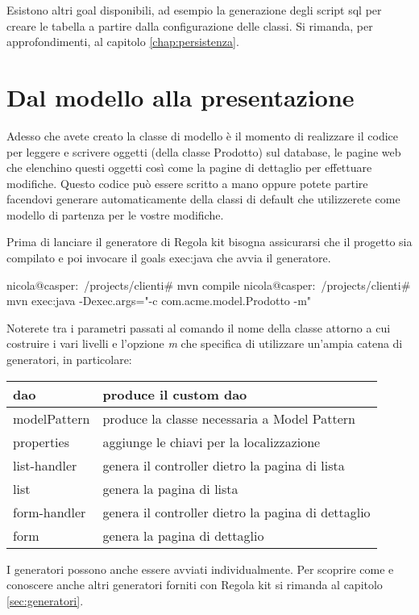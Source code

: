 \begin{nota}
Esistono altri goal disponibili, ad esempio la generazione degli script sql per creare le tabella a partire dalla configurazione delle classi. Si rimanda, per approfondimenti, al capitolo \vref{chap:persistenza}.
\end{nota}

\section{Dal modello alla presentazione}
Adesso che avete creato la classe di modello è il momento di realizzare il codice per leggere e scrivere oggetti (della classe Prodotto) sul database, le pagine web che elenchino questi oggetti così come la pagine di dettaglio per effettuare modifiche. Questo codice può essere scritto a mano oppure potete partire facendovi generare automaticamente della classi di default che utilizzerete come modello di partenza per le vostre modifiche.

 Prima di lanciare il generatore di Regola kit bisogna assicurarsi che il progetto sia compilato e poi invocare il goals exec:java che avvia il generatore. 

\begin{bash}
nicola@casper:~/projects/clienti# mvn compile
nicola@casper:~/projects/clienti# mvn exec:java -Dexec.args="-c com.acme.model.Prodotto -m"
\end{bash}

Noterete tra i parametri passati al comando il nome della classe attorno a cui costruire i vari livelli e l'opzione \emph{m} che specifica di utilizzare un'ampia catena di generatori, in particolare:

\begin{center}
{
  \begin{tabular}{ | l | p{9cm} | }
  \hline
  dao &  produce il custom dao \\ \hline
  modelPattern & produce la classe necessaria a Model Pattern   \\ \hline
  properties & aggiunge le chiavi per la localizzazione \\ \hline
  list-handler & genera il controller dietro la pagina di lista \\ \hline
  list &  genera la pagina di lista\\ \hline
  form-handler & genera il controller dietro la pagina di dettaglio\\ \hline
  form &  genera la pagina di dettaglio \\ \hline
  \end{tabular}
}
\end{center}

\begin{nota}
I generatori possono anche essere avviati individualmente. Per scoprire come e conoscere anche altri generatori forniti con Regola kit si rimanda al capitolo \vref{sec:generatori}.
\end{nota}






